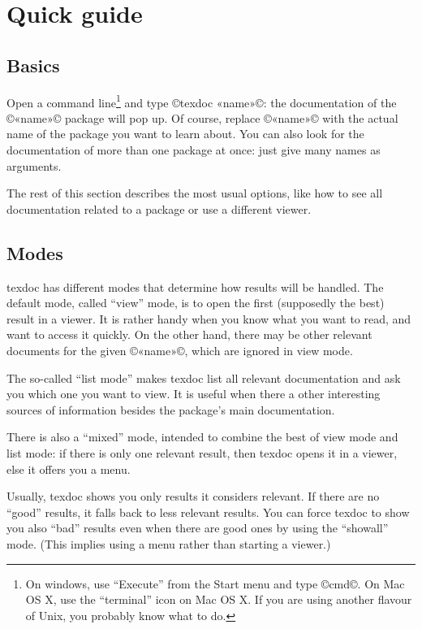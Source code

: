 \documentclass[a4paper, oneside]{scrartcl}
\title{\texdoc}
\subtitle{Find \& view documentation in \TeX\ Live}
\author{\url{http://tug.org/texdoc/}\\
  Manuel Pégourié-Gonnard}
\date{v0.70 2010-02-28}
\newcommand\texdoc{texdoc\xspace}
\begin{document}
\VerbatimFootnotes

\maketitle

\section{Quick guide}

\subsection{Basics}

Open a command line\footnote{On windows, use ``Execute'' from the Start menu
  and type ©cmd©.  On Mac OS X, use the ``terminal'' icon on Mac OS X.  If you
  are using another flavour of Unix, you probably know what to do.} and type
©texdoc «name»©: the documentation of the ©«name»© package will pop up. Of
course, replace ©«name»© with the actual name of the package you want to learn
about. You can also look for the documentation of more than one package at
once: just give many names as arguments.

The rest of this section describes the most usual options, like how to
see all documentation related to a package or use a different viewer.

\subsection{Modes}\label{ss-modes}

\texdoc has different modes that determine how results will be handled. The
default mode, called ``view'' mode, is to open the first (supposedly the best)
result in a viewer. It is rather handy when you know what you want to read,
and want to access it quickly. On the other hand, there may be other relevant
documents for the given ©«name»©, which are ignored in view mode.

The so-called ``list mode'' makes \texdoc list all relevant documentation and
ask you which one you want to view. It is useful when there a other
interesting sources of information besides the package's main documentation.

There is also a ``mixed'' mode, intended to combine the best of view mode and
list mode: if there is only one relevant result, then \texdoc opens it in a
viewer, else it offers you a menu.

Usually, \texdoc shows you only results it considers relevant. If there are no
``good'' results, it falls back to less relevant results. You can force
\texdoc to show you also ``bad'' results even when there are good ones by
using the ``showall'' mode. (This implies using a menu rather than starting a
viewer.)
\end{document}
